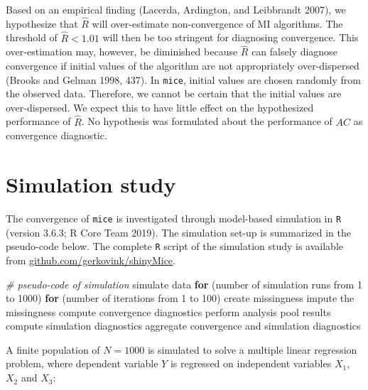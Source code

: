 \documentclass[
  Royal, times, sageapa]{sagej}
\newenvironment{Shaded}{\begin{snugshade}}{\end{snugshade}}
\newcommand{\CommentTok}[1]{\textcolor[rgb]{0.56,0.35,0.01}{\textit{#1}}}
\newcommand{\ControlFlowTok}[1]{\textcolor[rgb]{0.13,0.29,0.53}{\textbf{#1}}}
\newcommand{\DecValTok}[1]{\textcolor[rgb]{0.00,0.00,0.81}{#1}}
\newcommand{\NormalTok}[1]{#1}
\begin{document}
Based on an empirical finding (Lacerda, Ardington, and Leibbrandt 2007),
we hypothesize that \(\widehat{R}\) will over-estimate non-convergence
of MI algorithms. The threshold of \(\widehat{R} < 1.01\) will then be
too stringent for diagnosing convergence. This over-estimation may,
however, be diminished because \(\widehat{R}\) can falsely diagnose
convergence if initial values of the algorithm are not appropriately
over-dispersed (Brooks and Gelman 1998, 437). In \texttt{mice}, initial
values are chosen randomly from the observed data. Therefore, we cannot
be certain that the initial values are over-dispersed. We expect this to
have little effect on the hypothesized performance of \(\widehat{R}\).
No hypothesis was formulated about the performance of \(AC\) as
convergence diagnostic.

\hypertarget{simulation-study}{%
\section{Simulation study}\label{simulation-study}}

The convergence of \texttt{mice} is investigated through model-based
simulation in \texttt{R} (version 3.6.3; R Core Team 2019). The
simulation set-up is summarized in the pseudo-code below. The complete
\texttt{R} script of the simulation study is available from
\href{https://github.com/gerkovink/shinyMice/tree/master/3.Thesis/1.SimulationStudy}{github.com/gerkovink/shinyMice}.

\begin{Shaded}
\begin{Highlighting}[]
\CommentTok{# pseudo-code of simulation }
\NormalTok{simulate data }
\ControlFlowTok{for}\NormalTok{ (number of simulation runs from }\DecValTok{1}\NormalTok{ to }\DecValTok{1000}\NormalTok{)}
  \ControlFlowTok{for}\NormalTok{ (number of iterations from }\DecValTok{1}\NormalTok{ to }\DecValTok{100}\NormalTok{)}
\NormalTok{    create missingness}
\NormalTok{    impute the missingness}
\NormalTok{    compute convergence diagnostics}
\NormalTok{    perform analysis}
\NormalTok{    pool results}
\NormalTok{    compute simulation diagnostics}
\NormalTok{aggregate convergence and simulation diagnostics}
\end{Highlighting}
\end{Shaded}

A finite population of \(N=1000\) is simulated to solve a multiple
linear regression problem, where dependent variable \(Y\) is regressed
on independent variables \(X_1\), \(X_2\) and \(X_3\):
\end{document}
